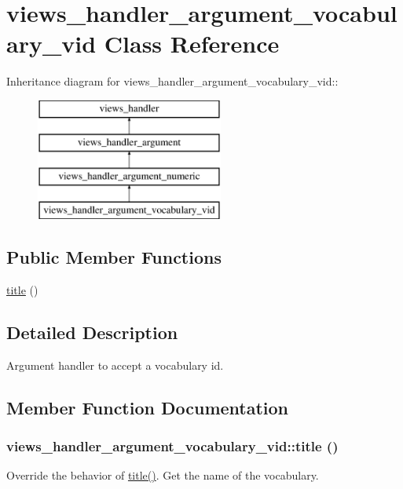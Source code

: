 \hypertarget{classviews__handler__argument__vocabulary__vid}{
\section{views\_\-handler\_\-argument\_\-vocabulary\_\-vid Class Reference}
\label{classviews__handler__argument__vocabulary__vid}
}
Inheritance diagram for views\_\-handler\_\-argument\_\-vocabulary\_\-vid::\begin{figure}[H]
\begin{center}
\leavevmode
\includegraphics[height=4cm]{classviews__handler__argument__vocabulary__vid}
\end{center}
\end{figure}
\subsection*{Public Member Functions}
\begin{DoxyCompactItemize}
\item 
\hyperlink{classviews__handler__argument__vocabulary__vid_af932cd38cbab2252261bcb077f2d9bd7}{title} ()
\end{DoxyCompactItemize}


\subsection{Detailed Description}
Argument handler to accept a vocabulary id. 

\subsection{Member Function Documentation}
\hypertarget{classviews__handler__argument__vocabulary__vid_af932cd38cbab2252261bcb077f2d9bd7}{
\subsubsection[{title}]{\setlength{\rightskip}{0pt plus 5cm}views\_\-handler\_\-argument\_\-vocabulary\_\-vid::title ()}}
\label{classviews__handler__argument__vocabulary__vid_af932cd38cbab2252261bcb077f2d9bd7}
Override the behavior of \hyperlink{classviews__handler__argument__vocabulary__vid_af932cd38cbab2252261bcb077f2d9bd7}{title()}. Get the name of the vocabulary. 

